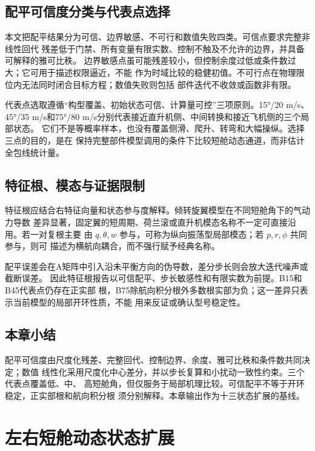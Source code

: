 \documentclass[UTF8,12pt,oneside,openany,fontset=windows]{ctexbook}
\begin{document}
\section{配平可信度分类与代表点选择}

本文把配平结果分为可信、边界敏感、不可行和数值失败四类。可信点要求完整非线性回代 残差低于门禁、所有变量有限实数、控制不触及不允许的边界，并具备可解释的雅可比秩。 边界敏感点虽可能残差较小，但控制余度过低或条件数过大；它可用于描述权限逼近，不能 作为时域比较的稳健初值。不可行点在物理限位内无法同时闭合目标方程；数值失败则包括 部件迭代不收敛或函数非有限。

代表点选取遵循“构型覆盖、初始状态可信、计算量可控”三项原则。15°/20 m/s、 45°/35 m/s和75°/80 m/s分别代表接近直升机侧、中间转换和接近飞机侧的三个局部状态。 它们不是等概率样本，也没有覆盖侧滑、爬升、转弯和大幅操纵。选择三点的目的，是在 保持完整部件模型调用的条件下比较短舱动态通道，而非估计全包线统计量。

\section{特征根、模态与证据限制}

特征根应结合右特征向量和状态参与度解释。倾转旋翼模型在不同短舱角下的气动力导数 差异显著，固定翼的短周期、荷兰滚或直升机模态名称不一定可直接沿用。若一对复根主要 由 \(q,\theta,w\) 参与，可称为纵向振荡型局部模态；若 \(p,r,\phi\) 共同参与，则可 描述为横航向耦合，而不强行赋予经典名称。

配平误差会在A矩阵中引入沿未平衡方向的伪导数，差分步长则会放大迭代噪声或截断误差。 因此特征根报告以可信配平、步长敏感性和有限实数为前提。B15和B45代表点仍存在正实部 根，B75除航向积分根外多数根实部为负；这一差异只表示当前模型的局部开环性质，不能 用来反证或确认型号稳定性。

\section{本章小结}

配平可信度由尺度化残差、完整回代、控制边界、余度、雅可比秩和条件数共同决定；数值 线性化采用尺度化中心差分，并以步长复算和小扰动一致性约束。三个代表点覆盖低、中、 高短舱角，但仅服务于局部机理比较。可信配平不等于开环稳定，正实部根和航向积分根 须分别解释。本章输出作为十三状态扩展的基线。

\chapter{左右短舱动态状态扩展}
\end{document}
